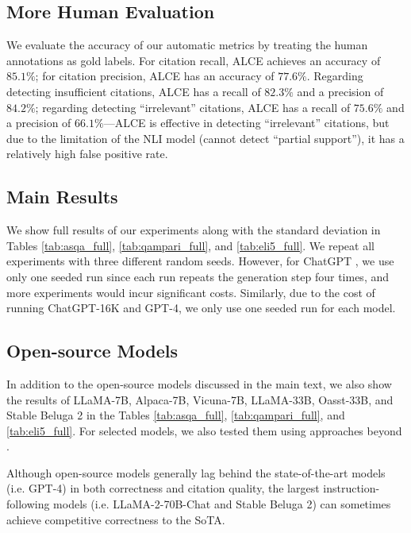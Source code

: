 \documentclass[11pt]{article}
\newcommand{\vani}{{\sc{Vanilla}}}
\newcommand{\rerank}{{\sc{Rerank}}}
\newcommand{\citeeval}{ALCE}
\begin{document}
\subsection{More Human Evaluation}
\label{sec_more_human}



We evaluate the accuracy of our automatic metrics by treating the human annotations as gold labels.
For citation recall, \citeeval{} achieves an accuracy of $85.1\%$; for citation precision, \citeeval{} has an accuracy of $77.6\%$.
Regarding detecting insufficient citations, \citeeval{} has a recall of $82.3\%$ and a precision of $84.2\%$; 
regarding detecting ``irrelevant'' citations, \citeeval{} has a recall of $75.6\%$ and a precision of $66.1\%$---\citeeval{} is effective in detecting ``irrelevant'' citations, but 
due to the limitation of the NLI model (cannot detect ``partial support''), it has a relatively high false positive rate.

\subsection{Main Results}
\label{app_sec:more_main}
We show full results of our experiments along with the standard deviation 
in Tables \ref{tab:asqa_full}, \ref{tab:qampari_full}, and \ref{tab:eli5_full}.
We repeat all experiments with three different random seeds. 
However, for ChatGPT \rerank, we use only one seeded run since each run repeats the generation step four times, and more experiments would incur significant costs. Similarly, due to the cost of running ChatGPT-16K and GPT-4, we only use one seeded run for each model. 

\subsection{Open-source Models}
\label{app_sec:open-source-models}
In addition to the open-source models discussed in the main text, we also show the results of LLaMA-7B, Alpaca-7B, Vicuna-7B, LLaMA-33B, Oasst-33B, and Stable Beluga 2 in the Tables \ref{tab:asqa_full}, \ref{tab:qampari_full}, and \ref{tab:eli5_full}.
For selected models, we also tested them using approaches beyond \vani{}. 

Although open-source models generally lag behind the state-of-the-art models (i.e. GPT-4) in both correctness and citation quality, the largest instruction-following models (i.e. LLaMA-2-70B-Chat and Stable Beluga 2) can sometimes achieve competitive correctness to the SoTA. 
\end{document}
